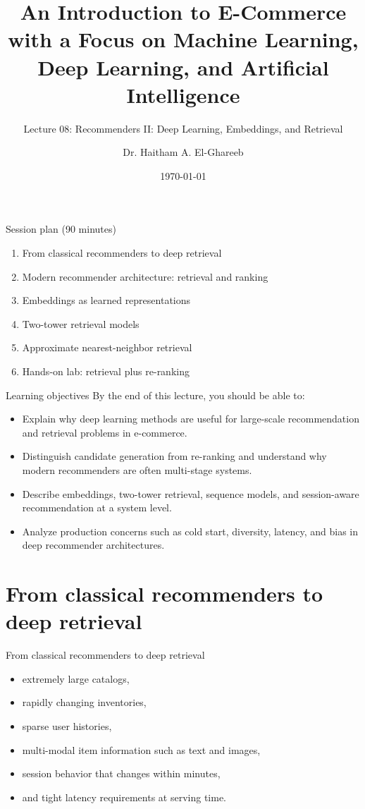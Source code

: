 \documentclass[aspectratio=169]{beamer}
\title[Lecture 08]{An Introduction to E-Commerce\\\small with a Focus on Machine Learning, Deep Learning, and Artificial Intelligence}
\subtitle{Lecture 08: Recommenders II: Deep Learning, Embeddings, and Retrieval}
\author{Dr. Haitham A. El-Ghareeb}
\institute{Faculty of Computers and Information Sciences \\ Mansoura University \\ Egypt}
\date{\today}
\begin{document}
\begin{frame}
  \titlepage
\end{frame}

\begin{frame}{Session plan (90 minutes)}
  \begin{enumerate}
    \item From classical recommenders to deep retrieval
    \item Modern recommender architecture: retrieval and ranking
    \item Embeddings as learned representations
    \item Two-tower retrieval models
    \item Approximate nearest-neighbor retrieval
    \item Hands-on lab: retrieval plus re-ranking
  \end{enumerate}
\end{frame}

\begin{frame}{Learning objectives}
  By the end of this lecture, you should be able to:
  \begin{itemize}
    \item Explain why deep learning methods are useful for large-scale recommendation and retrieval problems in e-commerce.
    \item Distinguish candidate generation from re-ranking and understand why modern recommenders are often multi-stage systems.
    \item Describe embeddings, two-tower retrieval, sequence models, and session-aware recommendation at a system level.
    \item Analyze production concerns such as cold start, diversity, latency, and bias in deep recommender architectures.
  \end{itemize}
\end{frame}

\section{From classical recommenders to deep retrieval}

\begin{frame}{From classical recommenders to deep retrieval}
  \begin{itemize}
    \item extremely large catalogs,
    \item rapidly changing inventories,
    \item sparse user histories,
    \item multi-modal item information such as text and images,
    \item session behavior that changes within minutes,
    \item and tight latency requirements at serving time.
  \end{itemize}
\end{frame}
\end{document}
